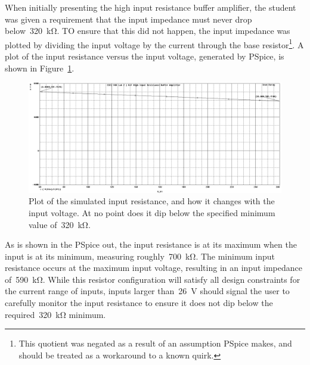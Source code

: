 When initially presenting the high input resistance buffer amplifier, the
student was given a requirement that the input impedance must never drop
below~\SI{320}{\kilo\ohm}.  TO ensure that this did not happen, the input
impedance was plotted by dividing the input voltage by the current through the
base resistor\footnote{This quotient was negated as a result of an assumption
PSpice makes, and should be treated as a workaround to a known quirk.}.  A plot
of the input resistance versus the input voltage, generated by PSpice, is shown
in Figure~\ref{fig:bjtPlotR}.
%
\begin{figure}[H]
	\centering
	\includegraphics[width=\pwidth]{img/plot/bjtPlotR.PNG}
	\parbox{\pwidth}{
	\caption[PSpice Plot --- Buffer Amplifier (Resistance)]{Plot of the
		simulated input resistance, and how it changes with the input voltage.
		At no point does it dip below the specified minimum value
		of~\SI{320}{\kilo\ohm}.}
	\label{fig:bjtPlotR}}
\end{figure}
%
As is shown in the PSpice out, the input resistance is at its maximum when the
input is at its minimum, measuring roughly~\SI{700}{\kilo\ohm}.  The minimum
input resistance occurs at the maximum input voltage, resulting in an input
impedance of~\SI{590}{\kilo\ohm}.  While this resistor configuration will
satisfy all design constraints for the current range of inputs, inputs larger
than~\SI{26}{\volt} should signal the user to carefully monitor the input
resistance to ensure it does not dip below the required~\SI{320}{\kilo\ohm}
minimum.


